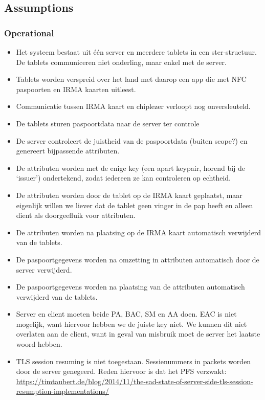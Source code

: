 \subsection{Assumptions}
\label{sec:assumptions}
\subsubsection{Operational}
\begin{itemize}
  \item Het systeem bestaat uit één server en meerdere tablets in een ster-structuur. De tablets communiceren niet onderling, maar enkel met de server.
  \item Tablets worden verspreid over het land met daarop een app die met NFC paspoorten en IRMA kaarten uitleest.
  \item Communicatie tussen IRMA kaart en chiplezer verloopt nog onversleuteld.
  \item De tablets sturen paspoortdata naar de server ter controle
  \item De server controleert de juistheid van de paspoortdata (buiten scope?) en genereert bijpassende attributen. 
  \item De attributen worden met de enige key (een apart keypair, horend bij de `issuer') ondertekend, zodat iedereen ze kan controleren op echtheid.
  \item De attributen worden door de tablet op de IRMA kaart geplaatst, maar eigenlijk willen we liever dat de tablet geen vinger in de pap heeft en alleen dient als doorgeefluik voor attributen.
  \item De attributen worden na plaatsing op de IRMA kaart automatisch verwijderd van de tablets.
  \item De paspoortgegevens worden na omzetting in attributen automatisch door de server verwijderd.
  \item De paspoortgegevens worden na plaatsing van de attributen automatisch verwijderd van de tablets.
  \item Server en client moeten beide PA, BAC, SM en AA doen. EAC is niet mogelijk, want hiervoor hebben we de juiste key niet. We kunnen dit niet overlaten aan de client, want in geval van misbruik moet de server het laatste woord hebben.
  \item TLS session resuming is niet toegestaan. Sessienummers in packets worden door de server genegeerd. Reden hiervoor is dat het PFS verzwakt: \url{https://timtaubert.de/blog/2014/11/the-sad-state-of-server-side-tls-session-resumption-implementations/}
\end{itemize}

